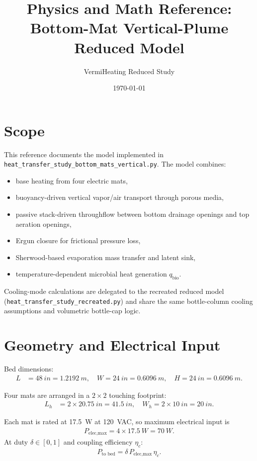 \documentclass[11pt]{article}
\title{Physics and Math Reference: Bottom-Mat Vertical-Plume Reduced Model}
\author{VermiHeating Reduced Study}
\date{\today}
\begin{document}
\maketitle

\section{Scope}
This reference documents the model implemented in
\texttt{heat\_transfer\_study\_bottom\_mats\_vertical.py}.
The model combines:
\begin{itemize}
\item base heating from four electric mats,
\item buoyancy-driven vertical vapor/air transport through porous media,
\item passive stack-driven throughflow between bottom drainage openings and top aeration openings,
\item Ergun closure for frictional pressure loss,
\item Sherwood-based evaporation mass transfer and latent sink,
\item temperature-dependent microbial heat generation $q_{\text{bio}}$.
\end{itemize}
Cooling-mode calculations are delegated to the recreated reduced model
(\texttt{heat\_transfer\_study\_recreated.py}) and share the same bottle-column
cooling assumptions and volumetric bottle-cap logic.

\section{Geometry and Electrical Input}
Bed dimensions:
\begin{align*}
L &= \SI{48}{in} = \SI{1.2192}{m},
\quad W = \SI{24}{in} = \SI{0.6096}{m},
\quad H = \SI{24}{in} = \SI{0.6096}{m}.
\end{align*}

Four mats are arranged in a $2\times 2$ touching footprint:
\begin{align*}
L_h &= 2\times \SI{20.75}{in} = \SI{41.5}{in},
\quad W_h = 2\times \SI{10}{in} = \SI{20}{in}.
\end{align*}

Each mat is rated at \SI{17.5}{W} at \SI{120}{VAC}, so maximum electrical input is
\begin{align*}
P_{\text{elec,max}} = 4\times \SI{17.5}{W} = \SI{70}{W}.
\end{align*}
At duty $\delta\in[0,1]$ and coupling efficiency $\eta_c$:
\begin{align*}
P_{\text{to bed}} = \delta\,P_{\text{elec,max}}\,\eta_c.
\end{align*}
\end{document}

